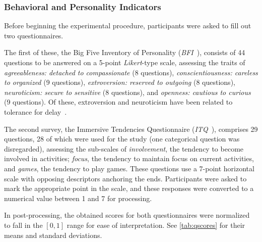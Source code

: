 \documentclass[10pt,letterpaper]{article}
\begin{document}
\subsubsection{Behavioral and Personality Indicators}

Before beginning the experimental procedure, participants were asked to fill out two questionnaires.

The first of these, the Big Five Inventory of Personality (\emph{BFI}~\cite{john1999:bfi}), consists of 44 questions to be answered on a 5-point \emph{Likert}-type scale, assessing the traits of \emph{agreeableness: detached to compassionate} (8 questions), \emph{conscientiousness: careless to organized} (9 questions), \emph{extroversion: reserved to outgoing} (8 questions), \emph{neuroticism: secure to sensitive} (8 questions), and \emph{openness: cautious to curious} (9 questions).
Of these, extroversion and neuroticism have been related to tolerance for delay~\cite{hirsh2008delay}. 

The second survey, the Immersive Tendencies Questionnaire (\emph{ITQ}~\cite{witmer1998:itq}), comprises 29 questions, 28 of which were used for the study (one categorical question was disregarded), assessing the sub-scales of \emph{involvement}, the tendency to become involved in activities; \emph{focus}, the tendency to maintain focus on current activities, and \emph{games}, the tendency to play games.
These questions use a 7-point horizontal scale  with opposing descriptors anchoring  the ends.
Participants were asked to mark the appropriate point in the scale, and these responses were converted to a numerical value between 1 and 7 for processing. 

In post-processing, the obtained scores for both questionnaires were normalized to fall in the \( [0, 1] \) range for ease of interpretation. 
See \cref{tab:qscores} for their means and standard deviations.
\end{document}
